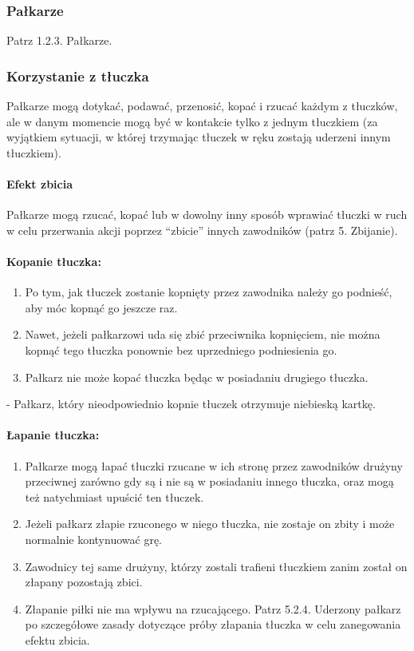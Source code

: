 \documentclass[12pt]{article}
\newcommand\bluecard{\bgroup\color{blue}\markoverwith{\textcolor{blue}{\rule[-0.5ex]{2pt}{0.4pt}}}\ULon}
\begin{document}
\subsubsection{Pałkarze}
Patrz 1.2.3. Pałkarze.

\subsubsection{Korzystanie z tłuczka}

Pałkarze mogą dotykać, podawać, przenosić, kopać i rzucać każdym z
tłuczków, ale w danym momencie mogą być w kontakcie tylko z jednym
tłuczkiem (za wyjątkiem sytuacji, w której trzymając tłuczek w ręku
zostają uderzeni innym tłuczkiem).

\paragraph{Efekt zbicia}
Pałkarze mogą rzucać, kopać lub w
dowolny inny sposób wprawiać tłuczki w ruch w celu przerwania akcji
poprzez ``zbicie'' innych zawodników (patrz 5. Zbijanie).

\paragraph{Kopanie tłuczka:}

\begin{enumerate}
	\item
	      Po tym, jak tłuczek zostanie kopnięty przez zawodnika należy go
	      podnieść, aby móc kopnąć go jeszcze raz.
	\item
	      Nawet, jeżeli pałkarzowi uda się zbić przeciwnika kopnięciem, nie
	      można kopnąć tego tłuczka ponownie bez uprzedniego podniesienia go.
	\item
	      Pałkarz nie może kopać tłuczka będąc w posiadaniu drugiego tłuczka.
\end{enumerate}

\bluecard{Niebieska kartka} - Pałkarz, który nieodpowiednio kopnie tłuczek
otrzymuje niebieską kartkę.

\paragraph{Łapanie tłuczka:}

\begin{enumerate}
	\item
	      Pałkarze mogą łapać tłuczki rzucane w ich stronę przez zawodników
	      drużyny przeciwnej zarówno gdy są i nie są w posiadaniu innego
	      tłuczka, oraz mogą też natychmiast upuścić ten tłuczek.
	\item
	      Jeżeli pałkarz złapie rzuconego w niego tłuczka, nie zostaje on zbity
	      i może normalnie kontynuować grę.
	\item
	      Zawodnicy tej same drużyny, którzy zostali trafieni tłuczkiem zanim
	      został on złapany pozostają zbici.
	\item
	      Złapanie piłki nie ma wpływu na rzucającego. Patrz 5.2.4. Uderzony
	      pałkarz po szczegółowe zasady dotyczące próby złapania tłuczka w celu
	      zanegowania efektu zbicia.
\end{enumerate}
\end{document}
